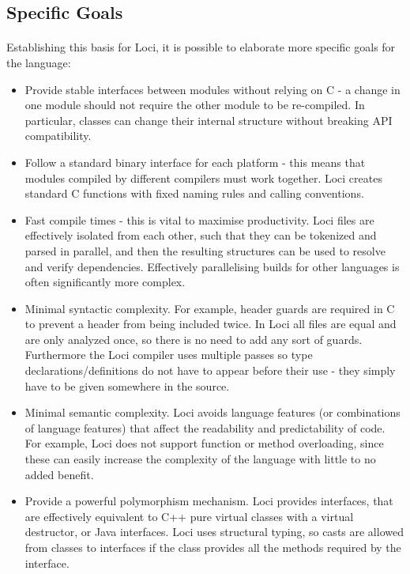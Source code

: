 \documentclass{article}
\begin{document}
\paragraph{}


\subsection{Specific Goals}

\paragraph{}
Establishing this basis for Loci, it is possible to elaborate more specific goals for the language:

\begin{itemize}
\item Provide stable interfaces between modules without relying on C - a change in one module should not require the other module to be re-compiled. In particular, classes can change their internal structure without breaking API compatibility.
\item Follow a standard binary interface for each platform - this means that modules compiled by different compilers must work together. Loci creates standard C functions with fixed naming rules and calling conventions.
\item Fast compile times - this is vital to maximise productivity. Loci files are effectively isolated from each other, such that they can be tokenized and parsed in parallel, and then the resulting structures can be used to resolve and verify dependencies. Effectively parallelising builds for other languages is often significantly more complex.
\item Minimal syntactic complexity. For example, header guards are required in C to prevent a header from being included twice. In Loci all files are equal and are only analyzed once, so there is no need to add any sort of guards. Furthermore the Loci compiler uses multiple passes so type declarations/definitions do not have to appear before their use - they simply have to be given somewhere in the source.
\item Minimal semantic complexity. Loci avoids language features (or combinations of language features) that affect the readability and predictability of code. For example, Loci does not support function or method overloading, since these can easily increase the complexity of the language with little to no added benefit.
\item Provide a powerful polymorphism mechanism. Loci provides interfaces, that are effectively equivalent to C++ pure virtual classes with a virtual destructor, or Java interfaces. Loci uses structural typing, so casts are allowed from classes to interfaces if the class provides all the methods required by the interface.
\end{itemize}
\end{document}
